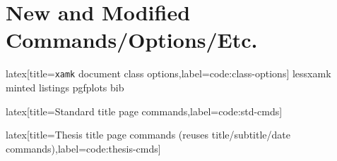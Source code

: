 \section{New and Modified Commands/Options/Etc.}

\begin{code}{latex}[title={\texttt{xamk} document class options},label=code:class-options]
lessxamk
minted
listings
pgfplots
bib
\end{code}
%
\begin{code}[firstnumber=last]{latex}[title={Standard title page commands},label=code:std-cmds]
\maketitle
\end{code}
%
\begin{code}[firstnumber=last]{latex}[title={Thesis title page commands (reuses title/subtitle/date commands)},label=code:thesis-cmds]
\maketitle[thesis]
\end{code}
